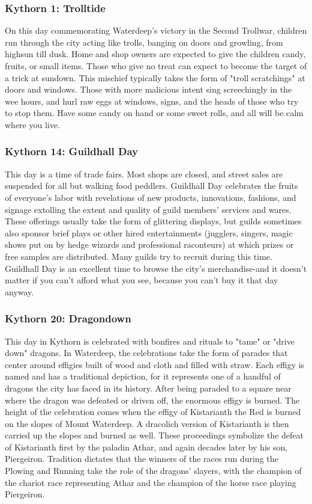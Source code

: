 \documentclass[10pt,a4paper,twoside,twocolumn,openany,nodeprecatedcode]{dndbook}
\begin{document}
\subsubsection{Kythorn 1: Trolltide}
On this day commemorating Waterdeep's victory in the Second Trollwar, children run through the city acting like trolls, banging on doors and growling, from highsun till dusk. Home and shop owners are expected to give the children candy, fruits, or small items. Those who give no treat can expect to become the target of a trick at sundown. This mischief typically takes the form of "troll scratchings" at doors and windows. Those with more malicious intent sing screechingly in the wee hours, and hurl raw eggs at windows, signs, and the heads of those who try to stop them. Have some candy on hand or some sweet rolls, and all will be calm where you live.
\subsubsection{Kythorn 14: Guildhall Day}
This day is a time of trade fairs. Most shops are closed, and street sales are suspended for all but walking food peddlers. Guildhall Day celebrates the fruits of everyone's labor with revelations of new products, innovations, fashions, and signage extolling the extent and quality of guild members' services and wares. These offerings usually take the form of glittering displays, but guilds sometimes also sponsor brief plays or other hired entertainments (jugglers, singers, magic shows put on by hedge wizards and professional raconteurs) at which prizes or free samples are distributed. Many guilds try to recruit during this time. Guildhall Day is an excellent time to browse the city's merchandise-and it doesn't matter if you can't afford what you see, because you can't buy it that day anyway.
\subsubsection{Kythorn 20: Dragondown}
This day in Kythorn is celebrated with bonfires and rituals to "tame" or "drive down" dragons. In Waterdeep, the celebrations take the form of parades that center around effigies built of wood and cloth and filled with straw. Each effigy is named and has a traditional depiction, for it represents one of a handful of dragons the city has faced in its history. After being paraded to a square near where the dragon was defeated or driven off, the enormous effigy is burned.
The height of the celebration comes when the effigy of Kistarianth the Red is burned on the slopes of Mount Waterdeep. A dracolich version of Kistarianth is then carried up the slopes and burned as well. These proceedings symbolize the defeat of Kistarianth first by the paladin Athar, and again decades later by his son, Piergeiron. Tradition dictates that the winners of the races run during the Plowing and Running take the role of the dragons' slayers, with the champion of the chariot race representing Athar and the champion of the horse race playing Piergeiron.
\end{document}
